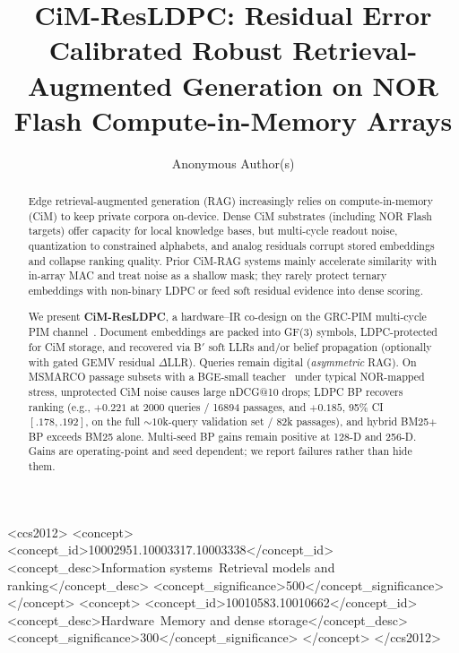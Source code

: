\documentclass[sigconf,review,anonymous]{acmart}
\begin{document}
\title{CiM-ResLDPC: Residual Error Calibrated Robust Retrieval-Augmented Generation on NOR Flash Compute-in-Memory Arrays}

\author{Anonymous Author(s)}

\begin{abstract}
Edge retrieval-augmented generation (RAG) increasingly relies on compute-in-memory (CiM) to keep private corpora on-device.
Dense CiM substrates (including NOR Flash targets) offer capacity for local knowledge bases, but multi-cycle readout noise, quantization to constrained alphabets, and analog residuals corrupt stored embeddings and collapse ranking quality.
Prior CiM-RAG systems mainly accelerate similarity with in-array MAC and treat noise as a shallow mask; they rarely protect ternary embeddings with non-binary LDPC or feed soft residual evidence into dense scoring.

We present \textbf{CiM-ResLDPC}, a hardware--IR co-design on the GRC-PIM multi-cycle PIM channel~\cite{grcpim2025}.
Document embeddings are packed into GF(3) symbols, LDPC-protected for CiM storage, and recovered via B$'$ soft LLRs and/or belief propagation (optionally with gated GEMV residual $\Delta$LLR).
Queries remain digital (\emph{asymmetric} RAG).
On MSMARCO passage subsets with a BGE-small teacher~\cite{xiao2023bge} under typical NOR-mapped stress, unprotected CiM noise causes large nDCG@10 drops; LDPC BP recovers ranking (e.g., $+0.221$ at 2000 queries / 16894 passages, and $+0.185$, 95\% CI $[.178,.192]$, on the full ${\sim}10$k-query validation set / 82k passages), and hybrid BM25$+$BP exceeds BM25 alone.
Multi-seed BP gains remain positive at 128-D and 256-D.
Gains are operating-point and seed dependent; we report failures rather than hide them.
\end{abstract}

\begin{CCSXML}
<ccs2012>
 <concept>
  <concept_id>10002951.10003317.10003338</concept_id>
  <concept_desc>Information systems~Retrieval models and ranking</concept_desc>
  <concept_significance>500</concept_significance>
 </concept>
 <concept>
  <concept_id>10010583.10010662</concept_id>
  <concept_desc>Hardware~Memory and dense storage</concept_desc>
  <concept_significance>300</concept_significance>
 </concept>
</ccs2012>
\end{CCSXML}

\end{document}
